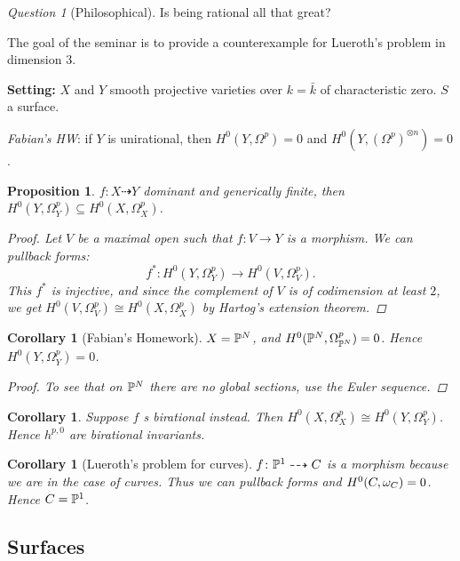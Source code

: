 \documentclass[A4paper, british, reqno]{amsart}
\theoremstyle{darkgreentheorem}
\newtheorem{prop}[thm]{Proposition}
\newtheorem{cor}[thm]{Corollary}
\theoremstyle{darkbluedefinition}
\theoremstyle{darkredexample}
\theoremstyle{remark}
\newtheorem{q}[thm]{Question}
\newcommand{\1}{\mathbbm{1}}
\newcommand{\ot}{\otimes}
\newcommand{\sub}{\subseteq}
\begin{document}
\begin{q}[Philosophical]
    Is being rational all that great?
\end{q}

The goal of the seminar is to provide a counterexample for Lueroth's problem in dimension $3$.

\textbf{Setting:}
$X$ and $Y$ smooth projective varieties over $k=\bar{k}$ of characteristic zero.
$S$ a surface.

\textit{Fabian's HW}: if $Y$ is unirational, then $H^{0}(Y, \Omega^{p})=0$ and $H^{0}(Y,(\Omega^{p})^{\ot n})=0$.

\begin{prop}
    $f\colon X\dashrightarrow Y$ dominant and generically finite, then $H^{0}(Y,\Omega_{Y}^{p})\sub H^{0}(X,\Omega_{X}^{p})$.
    \begin{proof}
	Let $V$ be a maximal open such that $f\colon V\to Y$ is a morphism.
	We can pullback forms:
	\[ f^{*}\colon H^{0}(Y,\Omega_{Y}^{p})\to H^{0}(V,\Omega_{V}^{p}). \]
	This $f^{*}$ is injective, and since the complement of $V$ is of codimension at least $2$, we get $H^{0}(V,\Omega_{V}^{p})\cong H^{0}(X,\Omega_{X}^{p})$ by Hartog's extension theorem.
    \end{proof}
\end{prop}

\begin{cor}[Fabian's Homework]
    $X=\P^{N}$, and $H^{0}(\P^{N},\Omega_{\P^{N}}^{p})=0$.
    Hence $H^{0}(Y,\Omega_{Y}^{p})=0$.
    \begin{proof}
	To see that on $\P^{N}$ there are no global sections, use the Euler sequence.
    \end{proof}
\end{cor}

\begin{cor}
    Suppose $f$ s birational instead.
    Then $H^{0}(X,\Omega_{X}^{p})\cong H^{0}(Y,\Omega_{Y}^{p})$.
    Hence $h^{p,0}$ are birational invariants.
\end{cor}

\begin{cor}[Lueroth's problem for curves]
    $f\colon \P^{1}\dashrightarrow C$ is a morphism because we are in the case of curves.
    Thus we can pullback forms and $H^{0}(C,\w_{C})=0$.
    Hence $C=\P^{1}$.
\end{cor}

\subsection{Surfaces}
\end{document}
